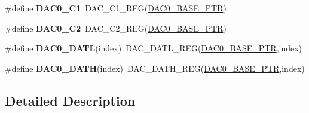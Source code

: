 \begin{DoxyCompactItemize}
\item 
\mbox{\label{group___d_a_c___register___accessor___macros_ga54148f65bd470a8414d0de17427b3c50}} 
\#define {\bfseries D\+A\+C0\+\_\+\+C1}~D\+A\+C\+\_\+\+C1\+\_\+\+R\+EG(\hyperlink{group___d_a_c___peripheral_gabe3b30df06ec04e5c899efd6e49f1800}{D\+A\+C0\+\_\+\+B\+A\+S\+E\+\_\+\+P\+TR})
\item 
\mbox{\label{group___d_a_c___register___accessor___macros_ga1f3d911fd37856fcdd26fe596f884c09}} 
\#define {\bfseries D\+A\+C0\+\_\+\+C2}~D\+A\+C\+\_\+\+C2\+\_\+\+R\+EG(\hyperlink{group___d_a_c___peripheral_gabe3b30df06ec04e5c899efd6e49f1800}{D\+A\+C0\+\_\+\+B\+A\+S\+E\+\_\+\+P\+TR})
\item 
\mbox{\label{group___d_a_c___register___accessor___macros_gaed832510d2d49d0b46ff29bd65ef0a15}} 
\#define {\bfseries D\+A\+C0\+\_\+\+D\+A\+TL}(index)~D\+A\+C\+\_\+\+D\+A\+T\+L\+\_\+\+R\+EG(\hyperlink{group___d_a_c___peripheral_gabe3b30df06ec04e5c899efd6e49f1800}{D\+A\+C0\+\_\+\+B\+A\+S\+E\+\_\+\+P\+TR},index)
\item 
\mbox{\label{group___d_a_c___register___accessor___macros_ga0c1025944a54ab896169911f32453cf1}} 
\#define {\bfseries D\+A\+C0\+\_\+\+D\+A\+TH}(index)~D\+A\+C\+\_\+\+D\+A\+T\+H\+\_\+\+R\+EG(\hyperlink{group___d_a_c___peripheral_gabe3b30df06ec04e5c899efd6e49f1800}{D\+A\+C0\+\_\+\+B\+A\+S\+E\+\_\+\+P\+TR},index)
\end{DoxyCompactItemize}


\subsection{Detailed Description}
